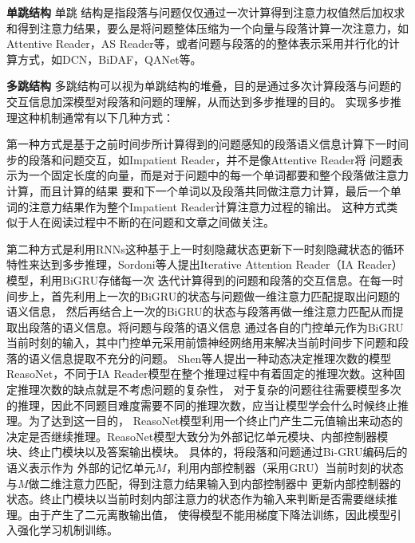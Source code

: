 \noindent \textbf{单跳结构} \quad 单跳
结构是指段落与问题仅仅通过一次计算得到注意力权值然后加权求和得到注意力结果，要么是将问题整体压缩为一个向量与段落计算一次注意力，如Attentive Reader，AS Reader等，或者问题与段落的的整体表示采用并行化的计算方式，如DCN，BiDAF，QANet等。
\vspace{1ex}

\noindent \textbf{多跳结构} \quad 多跳结构可以视为单跳结构的堆叠，目的是通过多次计算段落与问题的交互信息加深模型对段落和问题的理解，从而达到多步推理的目的。
实现多步推理这种机制通常有以下几种方式：
\vspace{1ex}

\noindent 第一种方式是基于之前时间步所计算得到的问题感知的段落语义信息计算下一时间步的段落和问题交互，如Impatient Reader，并不是像Attentive Reader将
	问题表示为一个固定长度的向量，而是对于问题中的每一个单词都要和整个段落做注意力计算，而且计算的结果
	要和下一个单词以及段落共同做注意力计算，最后一个单词的注意力结果作为整个Impatient Reader计算注意力过程的输出。
	这种方式类似于人在阅读过程中不断的在问题和文章之间做关注。
\vspace{1ex}

\noindent
第二种方式是利用RNNs这种基于上一时刻隐藏状态更新下一时刻隐藏状态的循环特性来达到多步推理，Sordoni等人提出Iterative Attention Reader（IA Reader）模型，利用BiGRU存储每一次
迭代计算得到的问题和段落的交互信息。在每一时间步上，首先利用上一次的BiGRU的状态与问题做一维注意力匹配提取出问题的语义信息，
然后再结合上一次的BiGRU的状态与段落再做一维注意力匹配从而提取出段落的语义信息。将问题与段落的语义信息
通过各自的门控单元作为BiGRU当前时刻的输入，其中门控单元采用前馈神经网络用来解决当前时间步下问题和段落的语义信息提取不充分的问题。
Shen等人提出一种动态决定推理次数的模型ReasoNet，不同于IA Reader模型在整个推理过程中有着固定的推理次数。这种固定推理次数的缺点就是不考虑问题的复杂性，
对于复杂的问题往往需要模型多次的推理，因此不同题目难度需要不同的推理次数，应当让模型学会什么时候终止推理。为了达到这一目的，
ReasoNet模型利用一个终止门产生二元值输出来动态的决定是否继续推理。ReasoNet模型大致分为外部记忆单元模块、内部控制器模块、终止门模块以及答案输出模块。
具体的，将段落和问题通过Bi-GRU编码后的语义表示作为
外部的记忆单元$M$，利用内部控制器（采用GRU）当前时刻的状态与$M$做二维注意力匹配，得到注意力结果输入到内部控制器中
更新内部控制器的状态。终止门模块以当前时刻内部注意力的状态作为输入来判断是否需要继续推理。由于产生了二元离散输出值，
使得模型不能用梯度下降法训练，因此模型引入强化学习机制训练。
\vspace{1ex}
%

